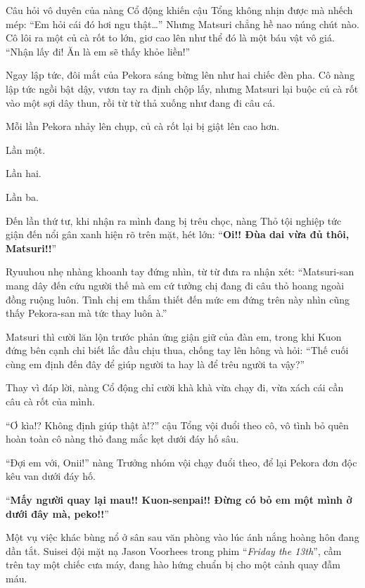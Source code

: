 \documentclass[../main.tex]{subfiles}
\begin{document}
Câu hỏi vô duyên của nàng Cổ động khiến cậu Tổng không nhịn được mà nhếch mép: ``Em hỏi cái đó hơi ngu thật\dots'' Nhưng Matsuri chẳng hề nao núng chút nào. Cô lôi ra một củ cà rốt to lớn, giơ cao lên như thể đó là một báu vật vô giá. ``Nhận lấy đi! Ăn là em sẽ thấy khỏe liền!''

Ngay lập tức, đôi mắt của Pekora sáng bừng lên như hai chiếc đèn pha. Cô nàng lập tức ngồi bật dậy, vươn tay ra định chộp lấy, nhưng Matsuri lại buộc củ cà rốt vào một sợi dây thun, rồi từ từ thả xuống như đang đi câu cá.

Mỗi lần Pekora nhảy lên chụp, củ cà rốt lại bị giật lên cao hơn.


Lần một.

Lần hai.

Lần ba.

Đến lần thứ tư, khi nhận ra mình đang bị trêu chọc, nàng Thỏ tội nghiệp tức giận đến nổi gân xanh hiện rõ trên mặt, hét lớn: ``\textbf{Oi!! Đùa dai vừa đủ thôi, Matsuri!!}''

Ryuuhou nhẹ nhàng khoanh tay đứng nhìn, từ từ đưa ra nhận xét: ``Matsuri-san mang dây đến cứu người thế mà em cứ tưởng chị đang đi câu thỏ hoang ngoài đồng ruộng luôn. Tình chị em thắm thiết đến mức em đứng trên này nhìn cũng thấy Pekora-san mà tức thay luôn à.''

Matsuri thì cười lăn lộn trước phản ứng giận giữ của đàn em, trong khi Kuon đứng bên cạnh chỉ biết lắc đầu chịu thua, chống tay lên hông và hỏi: ``Thế cuối cùng em định đến đây để giúp người ta hay là để trêu người ta vậy?''

Thay vì đáp lời, nàng Cổ động chỉ cười khà khà vừa chạy đi, vừa xách cái cần câu cà rốt của mình.

``Ơ kìa!? Không định giúp thật à!?'' cậu Tổng vội đuổi theo cô, vô tình bỏ quên hoàn toàn cô nàng thỏ đang mắc kẹt dưới đáy hố sâu.

``Đợi em với, Onii!'' nàng Trưởng nhóm vội chạy đuổi theo, để lại Pekora đơn độc kêu van dưới đáy hố.

``\textbf{Mấy người quay lại mau!! Kuon-senpai!! Đừng có bỏ em một mình ở dưới đây mà, peko!!}''

\ct

Một vụ việc khác bùng nổ ở sân sau văn phòng vào lúc ánh nắng hoàng hôn đang dần tắt. Suisei đội mặt nạ Jason Voorhees trong phim ``\textit{Friday the 13th}'', cầm trên tay một chiếc cưa máy, đang hào hứng chuẩn bị cho một cảnh quay đẫm máu.
\end{document}
